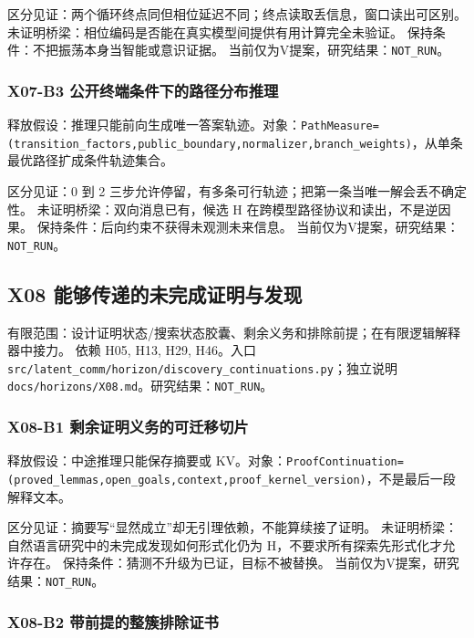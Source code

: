 \documentclass[
  10pt,
]{article}
\begin{document}
区分见证：两个循环终点同但相位延迟不同；终点读取丢信息，窗口读出可区别。
未证明桥梁：相位编码是否能在真实模型间提供有用计算完全未验证。
保持条件：不把振荡本身当智能或意识证据。
当前仅为V提案，研究结果：\nolinkurl{NOT_RUN}。

\subsubsection{X07-B3
公开终端条件下的路径分布推理}\label{x07-b3-ux516cux5f00ux7ec8ux7aefux6761ux4ef6ux4e0bux7684ux8defux5f84ux5206ux5e03ux63a8ux7406}

释放假设：推理只能前向生成唯一答案轨迹。对象：\nolinkurl{PathMeasure=(transition_factors,public_boundary,normalizer,branch_weights)}，从单条最优路径扩成条件轨迹集合。

区分见证：0 到 2
三步允许停留，有多条可行轨迹；把第一条当唯一解会丢不确定性。
未证明桥梁：双向消息已有，候选 H 在跨模型路径协议和读出，不是逆因果。
保持条件：后向约束不获得未观测未来信息。
当前仅为V提案，研究结果：\nolinkurl{NOT_RUN}。

\subsection{X08
能够传递的未完成证明与发现}\label{x08-ux80fdux591fux4f20ux9012ux7684ux672aux5b8cux6210ux8bc1ux660eux4e0eux53d1ux73b0}

有限范围：设计证明状态/搜索状态胶囊、剩余义务和排除前提；在有限逻辑解释器中接力。
依赖 H05, H13, H29, H46。入口
{\small\nolinkurl{src/latent_comm/horizon/discovery_continuations.py}}；独立说明
{\small\nolinkurl{docs/horizons/X08.md}}。研究结果：\nolinkurl{NOT_RUN}。

\subsubsection{X08-B1
剩余证明义务的可迁移切片}\label{x08-b1-ux5269ux4f59ux8bc1ux660eux4e49ux52a1ux7684ux53efux8fc1ux79fbux5207ux7247}

释放假设：中途推理只能保存摘要或
KV。对象：\nolinkurl{ProofContinuation=(proved_lemmas,open_goals,context,proof_kernel_version)}，不是最后一段解释文本。

区分见证：摘要写``显然成立''却无引理依赖，不能算续接了证明。
未证明桥梁：自然语言研究中的未完成发现如何形式化仍为
H，不要求所有探索先形式化才允许存在。
保持条件：猜测不升级为已证，目标不被替换。
当前仅为V提案，研究结果：\nolinkurl{NOT_RUN}。

\subsubsection{X08-B2
带前提的整簇排除证书}\label{x08-b2-ux5e26ux524dux63d0ux7684ux6574ux7c07ux6392ux9664ux8bc1ux4e66}
\end{document}
